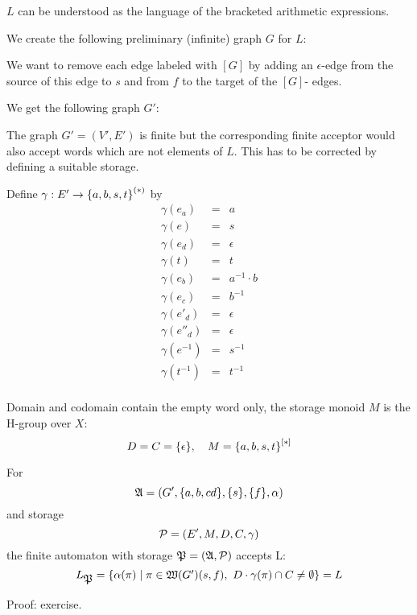 $L$ can be understood as the language of the bracketed arithmetic expressions.

We create the following preliminary (infinite) graph $G$ for $L$:

\begin{center}

\end{center}

We want to remove each edge labeled with $[G]$ by adding an $\epsilon$-edge
from the source of this edge to $s$ and from $f$ to the target of the $[G]$-
edges.

We get the following graph $G'$:

\begin{center}

\end{center}

The graph $G'=(V',E')$ is finite but the corresponding finite acceptor would
also accept words which are not elements of $L$. This has to be corrected by 
defining a suitable storage.

Define $\gamma: E' \to \mbox{${\mbox{$\{a, b, s, t\}$}}^{(*)}$}$ by
\begin{eqnarray*}
\gamma(e_a) & = & a \\
\gamma(e) & = & s \\
\gamma(e_d) & = & \epsilon \\
\gamma(t) & = & t \\
\gamma(e_b) & = & a^{-1} \cdot b \\
\gamma(e_c) & = & b^{-1} \\
\gamma(e'_d) & = & \epsilon \\
\gamma(e''_d) & = & \epsilon \\
\gamma(e^{-1}) & = & s^{-1} \\
\gamma(t^{-1}) & = & t^{-1} \\
\end{eqnarray*}

Domain and codomain contain the empty word only, the storage monoid $M$ is the
H-group over $X$:
\[ D = C = \mbox{$\{\epsilon\}$},\quad M = \mbox{${\mbox{$\{a, b, s, t\}$}}^{[*]}$} \]

For
\[ \mbox{$\mathfrak{A}$} = (G', \mbox{$\{a, b,c d\}$}, \mbox{$\{s\}$}, \mbox{$\{f\}$}, \alpha) \]
and storage 
\[ \mbox{$\mathcal{P}$} = (E', M, D, C, \gamma) \]
the finite automaton with storage $\mbox{$\mathfrak{P}$} = (\mbox{$\mathfrak{A}$}, \mbox{$\mathcal{P}$})$ accepts L:
\[ L_{\mbox{$\mathfrak{P}$}} = \mbox{$\{\alpha(\pi) \mid \pi \in \mbox{$\mathfrak{W}({G'})$}(s, f),\ D \cdot
\gamma(\pi) \cap C \neq \emptyset\}$} = L \]

Proof: exercise.

